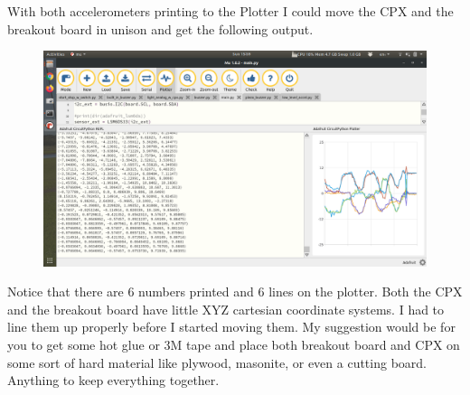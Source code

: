 With both accelerometers printing to the Plotter I could move the CPX and the breakout board in unison and get the following output.
\begin{figure}[H]
  \begin{center}
    \includegraphics[width=\textwidth]{Figures/imu_mu.png}
  \end{center}
\end{figure}
Notice that there are 6 numbers printed and 6 lines on the plotter. Both the CPX and the breakout board have little XYZ cartesian coordinate systems. I had to line them up properly before I started moving them. My suggestion would be for you to get some hot glue or 3M tape and place both breakout board and CPX on some sort of hard material like plywood, masonite, or even a cutting board. Anything to keep everything together.

